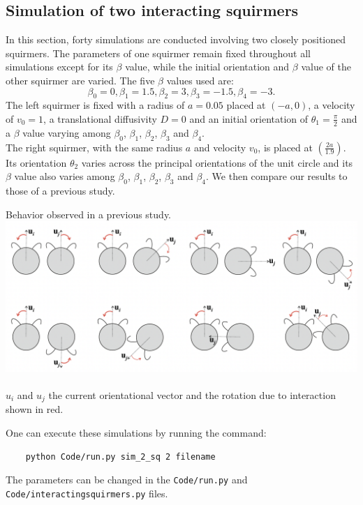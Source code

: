 \documentclass{article}
\begin{document}
\subsection{Simulation of two interacting squirmers}
In this section, forty simulations are conducted involving two closely positioned squirmers. 
The parameters of one squirmer remain fixed throughout all simulations except for its $\beta$ value, while 
the initial orientation and $\beta$ value of the other squirmer are varied. The five $\beta$ values used are:
$$\beta_0 = 0, \beta_1 = 1.5, \beta_2 = 3, \beta_3 = -1.5, \beta_4 = -3.$$ 
The left squirmer is fixed with a radius of $a=0.05$ placed at $(-a, 0)$, a velocity of $v_0=1$, a translational diffusivity $D=0$ and an initial orientation
of $\theta_1 = \frac{\pi}{2}$ and a $\beta$ value varying among $\beta_0$, $\beta_1$, $\beta_2$, $\beta_3$ and $\beta_4$.\\
The right squirmer, with the same radius $a$ and velocity $v_0$, is placed at $(\frac{2a}{1.9})$. Its orientation $\theta_2$
varies across the principal orientations of the unit circle and its $\beta$ value also varies among $\beta_0$, $\beta_1$, $\beta_2$, $\beta_3$ and $\beta_4$.
We then compare our results to those of a previous study.
\begin{center}
    Behavior observed in a previous study.
    \includegraphics[width=1\textwidth]{Presentation/images/stark_behavior.png}\\
    \cite{Stark}\\
    $u_i$ and $u_j$ the current orientational vector and the rotation due to interaction shown in red.  
 \end{center}
 One can execute these simulations by running the command:
 \begin{verbatim}
    python Code/run.py sim_2_sq 2 filename
 \end{verbatim}
 The parameters can be changed in the \texttt{Code/run.py} and \texttt{Code/interactingsquirmers.py} files.\\
\end{document}
